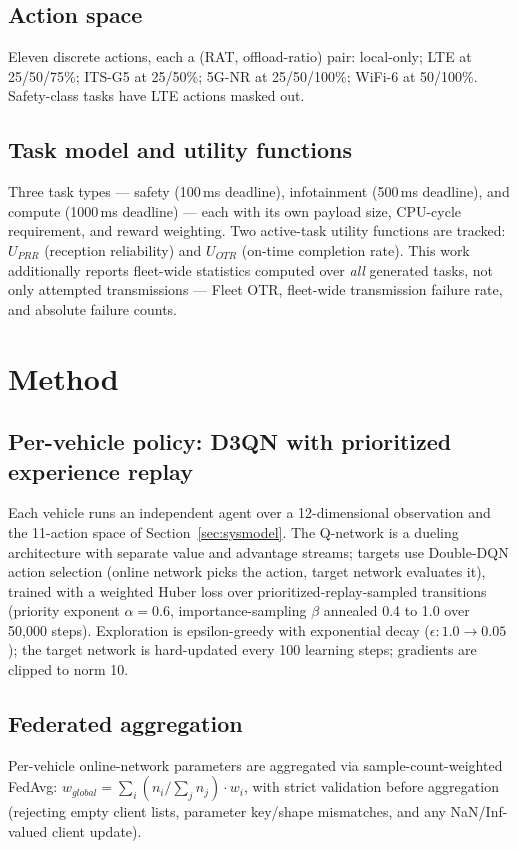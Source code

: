 \documentclass[journal,10pt,twocolumn]{IEEEtran}
\begin{document}
\subsection{Action space}
Eleven discrete actions, each a (RAT, offload-ratio) pair: local-only; LTE at 25/50/75\%; ITS-G5 at
25/50\%; 5G-NR at 25/50/100\%; WiFi-6 at 50/100\%. Safety-class tasks have LTE actions masked out.

\subsection{Task model and utility functions}
Three task types --- safety (100\,ms deadline), infotainment (500\,ms deadline), and compute
(1000\,ms deadline) --- each with its own payload size, CPU-cycle requirement, and reward
weighting. Two active-task utility functions are tracked: $U_{PRR}$ (reception reliability) and
$U_{OTR}$ (on-time completion rate). This work additionally reports fleet-wide statistics computed
over \emph{all} generated tasks, not only attempted transmissions --- Fleet OTR, fleet-wide
transmission failure rate, and absolute failure counts.

\section{Method}
\label{sec:method}

\subsection{Per-vehicle policy: D3QN with prioritized experience replay}
Each vehicle runs an independent agent over a 12-dimensional observation and the 11-action space of
Section~\ref{sec:sysmodel}. The Q-network is a dueling architecture with separate value and
advantage streams; targets use Double-DQN action selection (online network picks the action, target
network evaluates it), trained with a weighted Huber loss over prioritized-replay-sampled
transitions (priority exponent $\alpha=0.6$, importance-sampling $\beta$ annealed 0.4 to 1.0 over
50{,}000 steps). Exploration is epsilon-greedy with exponential decay ($\epsilon: 1.0 \to 0.05$);
the target network is hard-updated every 100 learning steps; gradients are clipped to norm 10.

\subsection{Federated aggregation}
Per-vehicle online-network parameters are aggregated via sample-count-weighted FedAvg:
$w_{global} = \sum_i (n_i / \sum_j n_j) \cdot w_i$, with strict validation before aggregation
(rejecting empty client lists, parameter key/shape mismatches, and any NaN/Inf-valued client
update).
\end{document}
